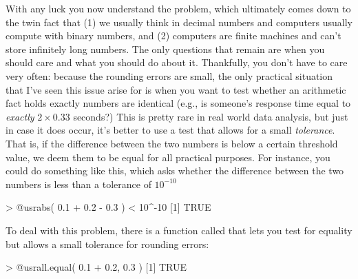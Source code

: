 With any luck you now understand the problem, which ultimately comes down to the twin fact that (1) we usually think in decimal numbers and computers usually compute with binary numbers, and (2) computers are finite machines and can't store infinitely long numbers. The only questions that remain are when you should care and what you should do about it. Thankfully, you don't have to care very often: because the rounding errors are small, the only practical situation that I've seen this issue arise for is when you want to test whether an arithmetic fact holds exactly numbers are identical (e.g., is someone's response time equal to {\it exactly} $2 \times 0.33$ seconds?) This is pretty rare in real world data analysis, but just in case it does occur, it's better to use a test that allows for a small {\it tolerance}. That is, if the difference between the two numbers is below a certain threshold value, we deem them to be equal for all practical purposes. For instance, you could do something like this, which asks whether the difference between the two numbers is less than a tolerance of $10^{-10}$
\begin{rblock1}
> @usr{abs( 0.1 + 0.2 - 0.3 ) < 10^-10}
[1] TRUE
\end{rblock1}
To deal with this problem, there is a function called  that lets you test for equality but allows a small tolerance for rounding errors:
\begin{rblock1}
> @usr{all.equal( 0.1 + 0.2, 0.3 )}
[1] TRUE
\end{rblock1}





